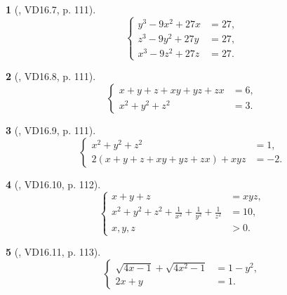 \documentclass{article}
\newtheorem{baitoan}{}
\begin{document}
\begin{baitoan}[\cite{TLCT_THCS_Toan_9_dai_so}, VD16.7, p. 111]
	\begin{equation*}
		\left\{\begin{split}
			y^3 - 9x^2 + 27x &= 27,\\
			z^3 - 9y^2 + 27y &= 27,\\
			x^3 - 9z^2 + 27z &= 27.
		\end{split}\right.
	\end{equation*}
\end{baitoan}

\begin{baitoan}[\cite{TLCT_THCS_Toan_9_dai_so}, VD16.8, p. 111]
	\begin{equation*}
		\left\{\begin{split}
			x + y + z + xy + yz + zx &= 6,\\
			x^2 + y^2 + z^2 &= 3.
		\end{split}\right.
	\end{equation*}
\end{baitoan}

\begin{baitoan}[\cite{TLCT_THCS_Toan_9_dai_so}, VD16.9, p. 111]
	\begin{equation*}
		\left\{\begin{split}
			x^2 + y^2 + z^2 &= 1,\\
			2(x + y + z + xy + yz + zx) + xyz &= -2.
		\end{split}\right.
	\end{equation*}
\end{baitoan}

\begin{baitoan}[\cite{TLCT_THCS_Toan_9_dai_so}, VD16.10, p. 112]
	\begin{equation*}
		\left\{\begin{split}
			x + y + z &= xyz,\\
			x^2 + y^2 + z^2 + \frac{1}{x^2} + \frac{1}{y^2} + \frac{1}{z^2} &= 10,\\
			x,y,z &> 0.
		\end{split}\right.
	\end{equation*}
\end{baitoan}

\begin{baitoan}[\cite{TLCT_THCS_Toan_9_dai_so}, VD16.11, p. 113]
	\begin{equation*}
		\left\{\begin{split}
			\sqrt{4x - 1} + \sqrt{4x^2 - 1} &= 1 - y^2,\\
			2x + y &= 1.
		\end{split}\right.
	\end{equation*}
\end{baitoan}
\end{document}
